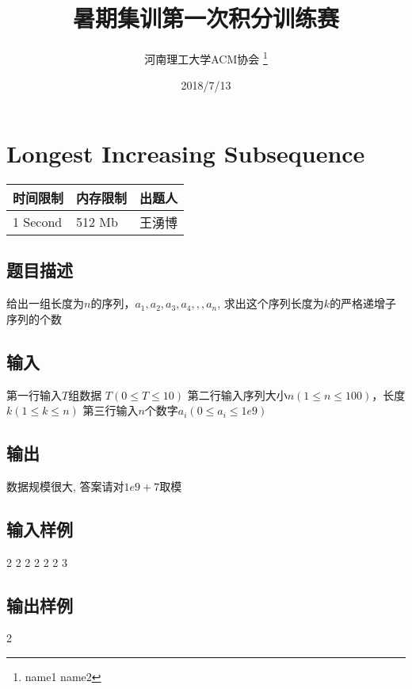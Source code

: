 \documentclass[12pt, a4paper]{article}
\title{暑期集训第一次积分训练赛}
\author{河南理工大学ACM协会 \thanks{name1 name2}}
\date{2018/7/13}
\begin{document}
\maketitle\newpage


\section{Longest Increasing Subsequence}

\begin{table}[!h]
  \centering
  \begin{tabular}{l|l|l}
  时间限制 & 内存限制 & 出题人 \\
  \hline
  1 Second & 512 Mb & 王湧博 \\
\end{tabular}
\end{table}

\subsection*{题目描述}

给出一组长度为$n$的序列，$a_1,a_2,a_3,a_4,,,a_n$, 求出这个序列长度为$k$的严格递增子序列的个数

\subsection*{输入}

第一行输入$T$组数据 $T (0\leq T\leq 10)$
\newline
第二行输入序列大小$n(1\leq n \leq100)$，长度$k(1\leq k \leq n)$
\newline
第三行输入$n$个数字$a_i(0\leq a_i \leq 1e9)$

\subsection*{输出}

数据规模很大, 答案请对$1e9+7$取模

\subsection*{输入样例}

2
 2
 2 2
 2
 2 3

\subsection*{输出样例}

2

\end{document}
